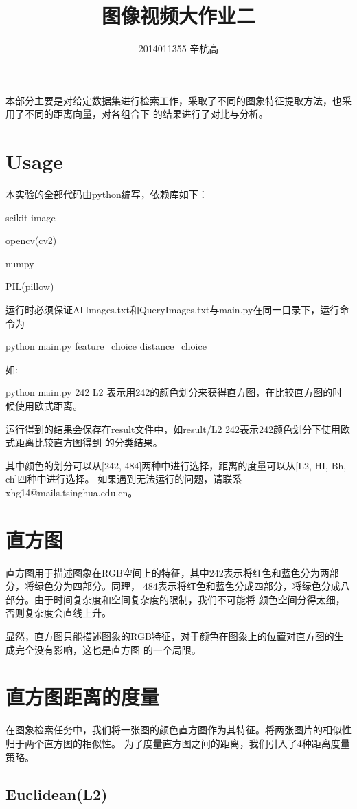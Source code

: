 \documentclass{ctexart}
\author{2014011355 辛杭高}
\title{图像视频大作业二}
\begin{document}
\maketitle
本部分主要是对给定数据集进行检索工作，采取了不同的图象特征提取方法，也采用了不同的距离向量，对各组合下
的结果进行了对比与分析。


\section{Usage}
本实验的全部代码由python编写，依赖库如下：

scikit-image

opencv(cv2)

numpy

PIL(pillow)

运行时必须保证AllImages.txt和QueryImages.txt与main.py在同一目录下，运行命令为

python main.py feature\_choice distance\_choice

如:

python main.py 242 L2 表示用242的颜色划分来获得直方图，在比较直方图的时候使用欧式距离。

运行得到的结果会保存在result文件中，如result/L2 242表示242颜色划分下使用欧式距离比较直方图得到
的分类结果。

其中颜色的划分可以从[242, 484]两种中进行选择，距离的度量可以从[L2, HI, Bh, ch]四种中进行选择。
如果遇到无法运行的问题，请联系xhg14@mails.tsinghua.edu.cn。

\section{直方图}
直方图用于描述图象在RGB空间上的特征，其中242表示将红色和蓝色分为两部分，将绿色分为四部分。同理，
484表示将红色和蓝色分成四部分，将绿色分成八部分。由于时间复杂度和空间复杂度的限制，我们不可能将
颜色空间分得太细，否则复杂度会直线上升。

显然，直方图只能描述图象的RGB特征，对于颜色在图象上的位置对直方图的生成完全没有影响，这也是直方图
的一个局限。

\section{直方图距离的度量}
在图象检索任务中，我们将一张图的颜色直方图作为其特征。将两张图片的相似性归于两个直方图的相似性。
为了度量直方图之间的距离，我们引入了4种距离度量策略。

\subsection{Euclidean(L2)}
\end{document}

